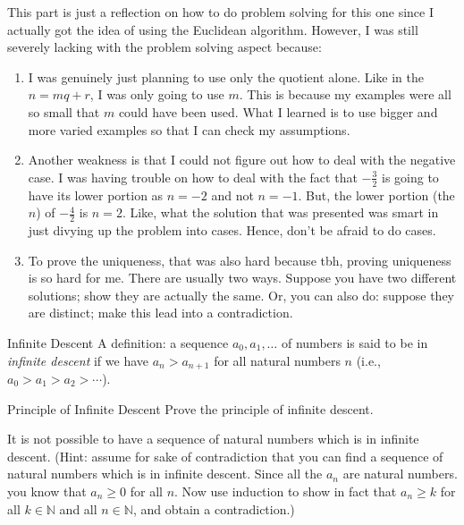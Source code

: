 This part is just a reflection on how to do problem solving for this one since I actually got the idea of using the Euclidean algorithm. 
However, I was still severely lacking with the problem solving aspect because:
\begin{enumerate}
    \item I was genuinely just planning to use only the quotient alone. Like in the $n = mq + r$, I was only going to use $m$.
    This is because my examples were all so small that $m$ could have been used. What I learned is to use bigger and more varied examples so that I can check my assumptions.
    \item Another weakness is that I could not figure out how to deal with the negative case. 
    I was having trouble on how to deal with the fact that $-\frac{3}{2}$ is going to have its lower portion as $n=-2$ and not $n=-1.$
    But, the lower portion (the $n$) of $-\frac{4}{2}$ is $n=2$. Like, what the solution that was presented was smart in just divying up the problem into cases.
    Hence, don't be afraid to do cases.
    \item To prove the uniqueness, that was also hard because tbh, proving uniqueness is so hard for me. 
    There are usually two ways. Suppose you have two different solutions; show they are actually the same.
    Or, you can also do: suppose they are distinct; make this lead into a contradiction.
\end{enumerate}
\begin{definition}{Infinite Descent}
    A definition: a sequence $a_0, a_1, \dots$ of numbers is said to be in \textit{infinite descent} if we have $a_n > a_{n+1}$ for all natural numbers $n$ (i.e., $a_0 > a_1 > a_2 > \cdots$).
\end{definition}
\begin{problem}{Principle of Infinite Descent}
    Prove the principle of infinite descent.
\end{problem}
\begin{proposition}
    It is not possible to have a sequence of natural numbers which is in infinite descent.
    (Hint: assume for sake of contradiction that you can find a sequence of natural numbers which is in infinite descent.
    Since all the $a_n$ are natural numbers. you know that $a_n \geq 0$ for all $n$.
    Now use induction to show in fact that $a_n \geq k$ for all $k \in \mathbb{N}$ and all $n \in \mathbb{N}$, and obtain a contradiction.)
\end{proposition}
